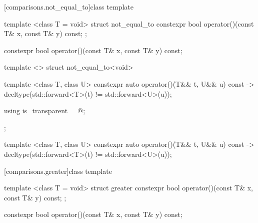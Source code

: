 \begin{itemdescr}
\pnum\returns {}
\end{itemdescr}

[comparisons.not_equal_to]{class template }

%
\begin{itemdecl}
template <class T = void> struct not_equal_to {
  constexpr bool operator()(const T& x, const T& y) const;
};
\end{itemdecl}

%
\begin{itemdecl}
constexpr bool operator()(const T& x, const T& y) const;
\end{itemdecl}

\begin{itemdescr}
\pnum\returns {}
\end{itemdescr}

%
\begin{itemdecl}
template <> struct not_equal_to<void> {
  template <class T, class U> constexpr auto operator()(T&& t, U&& u) const
    -> decltype(std::forward<T>(t) != std::forward<U>(u));

  using is_transparent = @\unspec@;
};
\end{itemdecl}

%
\begin{itemdecl}
template <class T, class U> constexpr auto operator()(T&& t, U&& u) const
    -> decltype(std::forward<T>(t) != std::forward<U>(u));
\end{itemdecl}

\begin{itemdescr}
\pnum\returns {}
\end{itemdescr}

[comparisons.greater]{class template }

%
\begin{itemdecl}
template <class T = void> struct greater {
  constexpr bool operator()(const T& x, const T& y) const;
};
\end{itemdecl}

%
\begin{itemdecl}
constexpr bool operator()(const T& x, const T& y) const;
\end{itemdecl}

